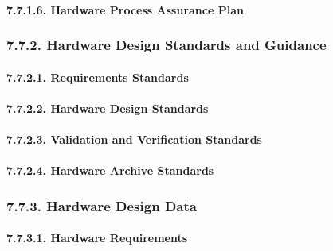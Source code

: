 \documentclass[
]{article}
\begin{document}
\hypertarget{hardware-process-assurance-plan}{%
\paragraph{7.7.1.6. Hardware Process Assurance
Plan}\label{hardware-process-assurance-plan}}

\hypertarget{hardware-design-standards-and-guidance}{%
\subsubsection{7.7.2. Hardware Design Standards and
Guidance}\label{hardware-design-standards-and-guidance}}

\hypertarget{requirements-standards}{%
\paragraph{7.7.2.1. Requirements
Standards}\label{requirements-standards}}

\hypertarget{hardware-design-standards}{%
\paragraph{7.7.2.2. Hardware Design
Standards}\label{hardware-design-standards}}

\hypertarget{validation-and-verification-standards}{%
\paragraph{7.7.2.3. Validation and Verification
Standards}\label{validation-and-verification-standards}}

\hypertarget{hardware-archive-standards}{%
\paragraph{7.7.2.4. Hardware Archive
Standards}\label{hardware-archive-standards}}

\hypertarget{hardware-design-data}{%
\subsubsection{7.7.3. Hardware Design Data}\label{hardware-design-data}}

\hypertarget{hardware-requirements}{%
\paragraph{7.7.3.1. Hardware Requirements}\label{hardware-requirements}}
\end{document}
